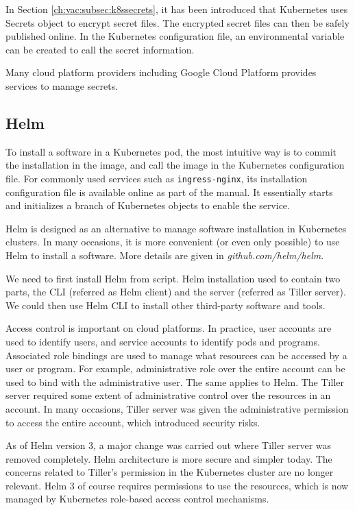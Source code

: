 In Section \ref{ch:vac:subsec:k8ssecrets}, it has been introduced that Kubernetes uses Secrets object to encrypt secret files. The encrypted secret files can then be safely published online. In the Kubernetes configuration file, an environmental variable can be created to call the secret information.

Many cloud platform providers including Google Cloud Platform provides services to manage secrets.

\subsection{Helm}

To install a software in a Kubernetes pod, the most intuitive way is to commit the installation in the image, and call the image in the Kubernetes configuration file. For commonly used services such as \verb|ingress-nginx|, its installation configuration file is available online as part of the manual. It essentially starts and initializes a branch of Kubernetes objects to enable the service.

Helm is designed as an alternative to manage software installation in Kubernetes clusters. In many occasions, it is more convenient (or even only possible) to use Helm to install a software. More details are given in \textit{github.com/helm/helm}.

We need to first install Helm from script. Helm installation used to contain two parts, the CLI (referred as Helm client) and the server (referred as Tiller server). We could then use Helm CLI to install other third-party software and tools.

Access control is important on cloud platforms. In practice, user accounts are used to identify users, and service accounts to identify pods and programs. Associated role bindings are used to manage what resources can be accessed by a user or program. For example, administrative role over the entire account can be used to bind with the administrative user. The same applies to Helm. The Tiller server required some extent of administrative control over the resources in an account. In many occasions, Tiller server was given the administrative permission to access the entire account, which introduced security risks.

As of Helm version 3, a major change was carried out where Tiller server was removed completely. Helm architecture is more secure and simpler today. The concerns related to Tiller's permission in the Kubernetes cluster are no longer relevant. Helm 3 of course requires permissions to use the resources, which is now managed by Kubernetes role-based access control mechanisms.

